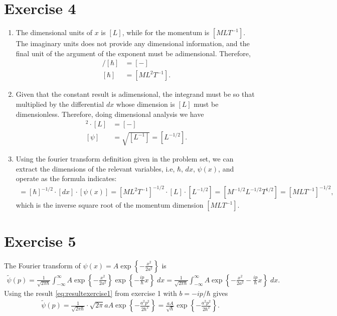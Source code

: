 \documentclass[letterpaper,11pt,twoside]{article}
\begin{document}
\section{Exercise 4}
\begin{enumerate}[itemsep=0pt,topsep=0pt,label=\alph*)]
  \item The dimensional units of $x$ is $[L]$, while for the momentum is $[MLT^{-1}]$. The imaginary units does not provide any dimensional information, and the final
  unit of the argument of the exponent must be adimensional. Therefore,
  \begin{align*}
    [MLT^{-1}][L]/[\hbar]&=[-]\\
    [\hbar]&=[ML^2T^{-1}].
  \end{align*}
  \item Given that the constant result is adimensional, the integrand must be so that multiplied by the differential $dx$ whose dimension is $[L]$ must be 
  dimensionless. Therefore, doing dimensional analysis we have  
  \begin{align*}
    [\psi]^2\cdot[L]&=[-]\\
    [\psi]&=\sqrt{[L^{-1}]}=[L^{-1/2}].
  \end{align*}
  \item Using the fourier transform definition given in the problem set, we can extract the dimensions of the relevant variables, i.e, $\hbar$, $dx$, $\psi(x)$, and 
  operate as the formula indicates:
  \begin{align}
    [\tilde{\psi}(p)]=[\hbar]^{-1/2}\cdot[dx]\cdot[\psi(x)]=[ML^2T^{-1}]^{-1/2}\cdot[L]\cdot[L^{-1/2}]=[M^{-1/2}L^{-1/2}T^{1/2}]=[MLT^{-1}]^{-1/2},
  \end{align} 
  which is the inverse square root of the momentum dimension $[MLT^{-1}]$.
\end{enumerate}
\section{Exercise 5}
The Fourier transform of $\psi(x)=A\exp\left\{-\frac{x^2}{2a^2}\right\}$ is 
\begin{align*}
  \tilde{\psi}(p)=\frac{1}{\sqrt{2\pi\hbar}}\int_{-\infty}^\infty A\exp\left\{-\frac{x^2}{2a^2}\right\}\exp\left\{-\frac{ip}{\hbar}x\right\}\;dx=\frac{1}{\sqrt{2\pi\hbar}}\int_{-\infty}^\infty A\exp\left\{-\frac{x^2}{2a^2}-\frac{ip}{\hbar}x\right\}\;dx.
\end{align*}
Using the result \eqref{eq:resultexercise1} from exercise 1 with $b=-ip/\hbar$ gives
\begin{align*}
  \tilde{\psi}(p)=\frac{1}{\sqrt{2\pi\hbar}}\cdot \sqrt{2\pi}aA\exp\left\{-\frac{a^2p^2}{2\hbar^2}\right\}=\frac{aA}{\sqrt{\hbar}}\exp\left\{-\frac{a^2p^2}{2\hbar^2}\right\}.
\end{align*}
\end{document}
